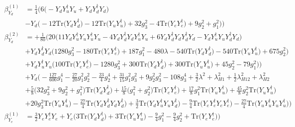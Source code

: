 {\begin{align}
\beta_{Y_d}^{(1)} & =  
\frac{1}{4} \Big(6 \Big(- {Y_d  Y_{u}^{\dagger}  Y_u}  + {Y_d  Y_{d}^{\dagger}  Y_d}\Big)\nonumber \\ 
 &- Y_d \Big(-12 \mbox{Tr}\Big({Y_d  Y_{d}^{\dagger}}\Big)  -12 \mbox{Tr}\Big({Y_u  Y_{u}^{\dagger}}\Big)  + 32 g_{3}^{2}  -4 \mbox{Tr}\Big({Y_e  Y_{e}^{\dagger}}\Big)  + 9 g_{2}^{2}  + g_{1}^{2}\Big)\Big)\\ 
\beta_{Y_d}^{(2)} & =  
+\frac{1}{80} \Big(20 \Big(11 {Y_d  Y_{u}^{\dagger}  Y_u  Y_{u}^{\dagger}  Y_u}  -4 {Y_d  Y_{d}^{\dagger}  Y_d  Y_{u}^{\dagger}  Y_u}  + 6 {Y_d  Y_{d}^{\dagger}  Y_d  Y_{d}^{\dagger}  Y_d}  - {Y_d  Y_{u}^{\dagger}  Y_u  Y_{d}^{\dagger}  Y_d} \Big)\nonumber \\ 
 &+{Y_d  Y_{d}^{\dagger}  Y_d} \Big(1280 g_{3}^{2}  -180 \mbox{Tr}\Big({Y_e  Y_{e}^{\dagger}}\Big)  + 187 g_{1}^{2}  -480 \lambda  -540 \mbox{Tr}\Big({Y_d  Y_{d}^{\dagger}}\Big)  -540 \mbox{Tr}\Big({Y_u  Y_{u}^{\dagger}}\Big)  + 675 g_{2}^{2} \Big)\nonumber \\ 
 &+{Y_d  Y_{u}^{\dagger}  Y_u} \Big(100 \mbox{Tr}\Big({Y_e  Y_{e}^{\dagger}}\Big)  -1280 g_{3}^{2}  + 300 \mbox{Tr}\Big({Y_d  Y_{d}^{\dagger}}\Big)  + 300 \mbox{Tr}\Big({Y_u  Y_{u}^{\dagger}}\Big)  + 45 g_{2}^{2}  -79 g_{1}^{2} \Big)\Big)\nonumber \\ 
 &+Y_d \Big(-\frac{127}{600} g_{1}^{4} -\frac{27}{20} g_{1}^{2} g_{2}^{2} -\frac{23}{4} g_{2}^{4} +\frac{31}{15} g_{1}^{2} g_{3}^{2} +9 g_{2}^{2} g_{3}^{2} -108 g_{3}^{4} +\frac{3}{2} \lambda^{2} +\lambda_{H1}^{2}+\frac{1}{2} \lambda_{H12}^{2} +\lambda_{H2}^{2}\nonumber \\ 
 &+\frac{5}{8} \Big(32 g_{3}^{2}  + 9 g_{2}^{2}  + g_{1}^{2}\Big)\mbox{Tr}\Big({Y_d  Y_{d}^{\dagger}}\Big) +\frac{15}{8} \Big(g_{1}^{2} + g_{2}^{2}\Big)\mbox{Tr}\Big({Y_e  Y_{e}^{\dagger}}\Big) +\frac{17}{8} g_{1}^{2} \mbox{Tr}\Big({Y_u  Y_{u}^{\dagger}}\Big) +\frac{45}{8} g_{2}^{2} \mbox{Tr}\Big({Y_u  Y_{u}^{\dagger}}\Big) \nonumber \\ 
 &+20 g_{3}^{2} \mbox{Tr}\Big({Y_u  Y_{u}^{\dagger}}\Big) -\frac{27}{4} \mbox{Tr}\Big({Y_d  Y_{d}^{\dagger}  Y_d  Y_{d}^{\dagger}}\Big) +\frac{3}{2} \mbox{Tr}\Big({Y_d  Y_{u}^{\dagger}  Y_u  Y_{d}^{\dagger}}\Big) -\frac{9}{4} \mbox{Tr}\Big({Y_e  Y_{e}^{\dagger}  Y_e  Y_{e}^{\dagger}}\Big) -\frac{27}{4} \mbox{Tr}\Big({Y_u  Y_{u}^{\dagger}  Y_u  Y_{u}^{\dagger}}\Big) \Big)\\ 
\beta_{Y_e}^{(1)} & =  
\frac{3}{2} {Y_e  Y_{e}^{\dagger}  Y_e}  + Y_e \Big(3 \mbox{Tr}\Big({Y_d  Y_{d}^{\dagger}}\Big)  + 3 \mbox{Tr}\Big({Y_u  Y_{u}^{\dagger}}\Big)  -\frac{9}{4} g_{1}^{2}  -\frac{9}{4} g_{2}^{2}  + \mbox{Tr}\Big({Y_e  Y_{e}^{\dagger}}\Big)\Big)\\ 

\end{align}}
